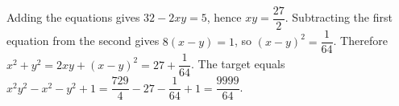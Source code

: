 Adding the equations gives $32-2 xy=5$, hence $xy=\dfrac{27}{2}$. Subtracting the first equation from the second gives $8(x-y)=1$, so $(x-y)^2=\dfrac{1}{64}$. Therefore $x^2+y^2=2 xy+(x-y)^2=27+\dfrac{1}{64}$. The target equals $x^2 y^2-x^2-y^2+1=\dfrac{729}{4}-27-\dfrac{1}{64}+1=\boxed{\dfrac{9999}{64}}$.

